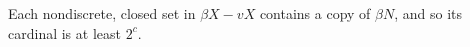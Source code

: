 Each nondiscrete, closed set in $\beta X - vX$ contains a copy of $\beta N$, and so its cardinal is at least $2^c$.
